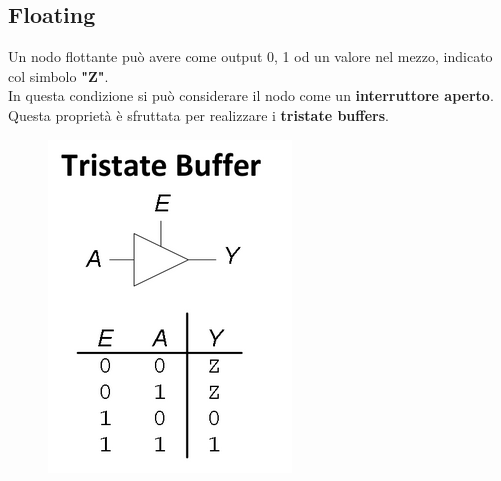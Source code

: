 \documentclass{report}
\begin{document}
    \subsection{Floating}
        Un nodo flottante può avere come output 0, 1 od un valore nel mezzo, indicato col 
        simbolo \textbf{"Z"}. \\
        In questa condizione si può considerare il nodo come un \textbf{interruttore aperto}. \\
        Questa proprietà è sfruttata per realizzare i \textbf{tristate buffers}.
        \begin{center}
            \begin{figure}[H]
                \includegraphics[width=\textwidth]{tristatebuffer.png}
            \end{figure}
        \end{center}  
\end{document}

